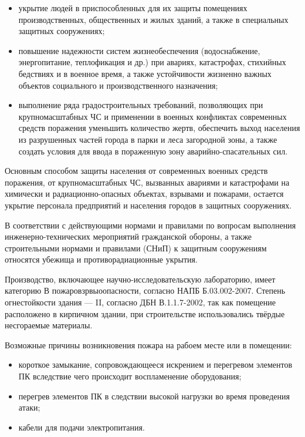 \begin{itemize}

    \item укрытие людей в приспособленных для их защиты помещениях
    производственных, общественных и жилых зданий, а также в специальных
    защитных сооружениях;
    
    \item повышение надежности систем жизнеобеспечения (водоснабжение,
    энергопитание, теплофикация и др.) при авариях, катастрофах, стихийных
    бедствиях и в военное время, а также устойчивости жизненно важных объектов
    социального и производственного назначения;
    
    \item выполнение ряда градостроительных требований, позволяющих при
    крупномасштабных ЧС и применении в военных конфликтах современных средств
    поражения уменьшить количество жертв, обеспечить выход населения из
    разрушенных частей города в парки и леса загородной зоны, а также создать
    условия для ввода в пораженную зону аварийно-спасательных сил.

\end{itemize}
    
Основным способом защиты населения от современных военных средств поражения, от
крупномасштабных ЧС, вызванных авариями и катастрофами на химически и
радиационно-опасных объектах, взрывами и пожарами, остается укрытие персонала
предприятий и населения городов в защитных сооружениях.

В соответствии с действующими нормами и правилами по вопросам выполнения
инженерно-технических мероприятий гражданской обороны, а также строительными
нормами и правилами (СНиП) к защитным сооружениям относятся убежища и
противорадиационные укрытия.

Производство, включающее научно-исследовательскую лабораторию, имеет категорию В
пожаровзрвыоопасности, согласно НАПБ Б.03.002-2007. Степень огнестойкости здания
--- II, согласно ДБН В.1.1.7-2002, так как помещение расположено в кирпичном
здании, при строительстве использовались твёрдые несгораемые материалы.

Возможные причины возникновения пожара на рабоем месте или в помещении:

\begin{itemize}

    \item короткое замыкание, сопровождающееся искрением и перегревом элементов
    ПК вследствие чего происходит воспламенение оборудования;

    \item перегрев элементов ПК в следствии высокой нагрузки во время проведения
    атаки;

    \item кабели для подачи электропитания.

\end{itemize}

